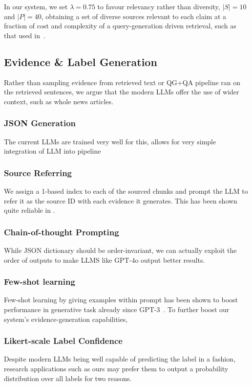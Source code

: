 In our system, we set $\lambda=0.75$ to favour relevancy rather than diversity, $|S|=10$ and $|P| = 40$, obtaining a set of diverse sources relevant to each claim at a fraction of cost and complexity of a query-generation driven retrieval, such as that used in~\cite{averitec2024}.

\subsection{Evidence \& Label Generation}
\label{sec:generation}
Rather than sampling evidence from retrieved text or QG+QA pipeline ran on the retrieved sentences, we argue that the modern LLMs offer the use of wider context, such as whole news articles.

\subsubsection{JSON Generation}
The current LLMs are trained very well for this, allows for very simple integration of LLM into pipeline

\subsubsection{Source Referring}
We assign a 1-based index to each of the sourced chunks and prompt the LLM to refer it as the source ID with each evidence it generates.
This has been shown quite reliable in .

\subsubsection{Chain-of-thought Prompting}
While JSON dictionary should be order-invariant, we can actually exploit the order of outputs to make LLMS like GPT-4o output better results.~\cite{cot}

\subsubsection{Few-shot learning}
Few-shot learning by giving examples within prompt has been shown to boost performance in generative task already since GPT-3~\cite{fewshot}.
To further boost our system's evidence-generation capabilities, 

\subsubsection{Likert-scale Label Confidence}
\label{likert}
Despite modern LLMs being well capable of predicting the label in a  fashion, research applications such as ours may prefer them to output a probability distribution over all labels for two reasons.


